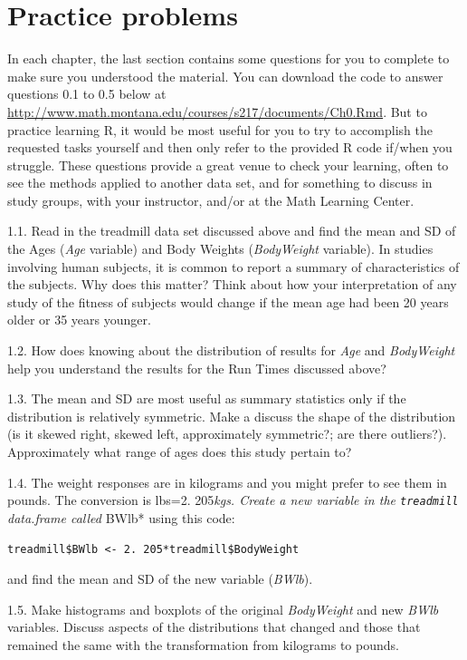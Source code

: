 \documentclass[]{book}
\begin{document}
\section{Practice problems}\label{practice-problems}

In each chapter, the last section contains some questions for you to
complete to make sure you understood the material. You can download the
code to answer questions 0.1 to 0.5 below at
\url{http://www.math.montana.edu/courses/s217/documents/Ch0.Rmd}. But to
practice learning R, it would be most useful for you to try to
accomplish the requested tasks yourself and then only refer to the
provided R code if/when you struggle. These questions provide a great
venue to check your learning, often to see the methods applied to
another data set, and for something to discuss in study groups, with
your instructor, and/or at the Math Learning Center.

1.1. Read in the treadmill data set discussed above and find the mean
and SD of the Ages (\emph{Age} variable) and Body Weights
(\emph{BodyWeight} variable). In studies involving human subjects, it is
common to report a summary of characteristics of the subjects. Why does
this matter? Think about how your interpretation of any study of the
fitness of subjects would change if the mean age had been 20 years older
or 35 years younger.

1.2. How does knowing about the distribution of results for \emph{Age}
and \emph{BodyWeight} help you understand the results for the Run Times
discussed above?

1.3. The mean and SD are most useful as summary statistics only if the
distribution is relatively symmetric. Make a discuss the shape of the
distribution (is it skewed right, skewed left, approximately symmetric?;
are there outliers?). Approximately what range of ages does this study
pertain to?

1.4. The weight responses are in kilograms and you might prefer to see
them in pounds. The conversion is lbs=2. 205\emph{kgs. Create a new
variable in the \texttt{treadmill}\\
data.frame called }BWlb* using this code:

\texttt{treadmill\$BWlb\ \textless{}-\ 2.\ 205*treadmill\$BodyWeight}

and find the mean and SD of the new variable (\emph{BWlb}).

1.5. Make histograms and boxplots of the original \emph{BodyWeight} and
new \emph{BWlb} variables. Discuss aspects of the distributions that
changed and those that remained the same with the transformation from
kilograms to pounds.
\end{document}
